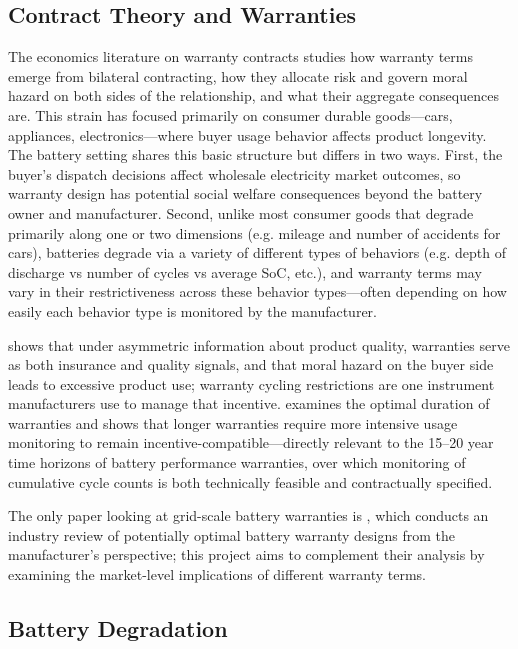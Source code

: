 \documentclass[12pt]{article}
\begin{document}
\subsection{Contract Theory and Warranties}

The economics literature on warranty contracts studies how warranty terms emerge from bilateral contracting, how they allocate risk and govern moral hazard on both sides of the relationship, and what their aggregate consequences are. This strain has focused primarily on consumer durable goods---cars, appliances, electronics---where buyer usage behavior affects product longevity. The battery setting shares this basic structure but differs in two ways. First, the buyer's dispatch decisions affect wholesale electricity market outcomes, so warranty design has potential social welfare consequences beyond the battery owner and manufacturer. Second, unlike most consumer goods that degrade primarily along one or two dimensions (e.g. mileage and number of accidents for cars), batteries degrade via a variety of different types of behaviors (e.g. depth of discharge vs number of cycles vs average SoC, etc.), and warranty terms may vary in their restrictiveness across these behavior types---often depending on how easily each behavior type is monitored by the manufacturer.

 \citet{emons1988}  shows that under asymmetric information about product quality, warranties serve as both insurance and quality signals, and that moral hazard on the buyer side leads to excessive product use; warranty cycling restrictions are one instrument manufacturers use to manage that incentive. \citet{emons1989} examines the optimal duration of warranties and shows that longer warranties require more intensive usage monitoring to remain incentive-compatible---directly relevant to the 15--20 year time horizons of battery performance warranties, over which monitoring of cumulative cycle counts is both technically feasible and contractually specified. 

 The only paper looking at grid-scale battery warranties is \citet{liuwang2025}, which conducts an industry review of  potentially optimal battery warranty designs from the manufacturer's perspective; this project aims to complement their analysis by examining the market-level implications of different warranty terms.

\subsection{Battery Degradation}
\end{document}
